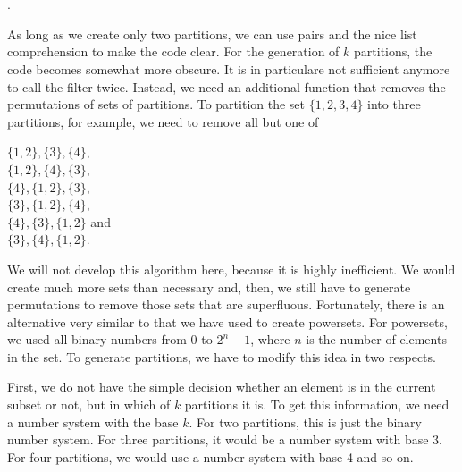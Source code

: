 \documentclass{scrreprt}
\newcommand{\texfamily}{\fontfamily{cmtex}\selectfont}
\newcommand{\Sp}{\hskip.33334em\relax}
\begin{document}
\text{\texfamily ([1,3],[2])}\\
\text{\texfamily ([2,3],[1])}\\
\text{\texfamily ([3],\Sp [1,2])}.

As long as we create only two partitions,
we can use pairs and the 
nice list comprehension to make the code clear.
For the generation of $k$ partitions,
the code becomes somewhat more obscure.
It is in particulare not sufficient anymore
to call the filter twice.
Instead, we need an additional function
that removes the permutations of sets of partitions.
To partition the set $\lbrace 1,2,3,4\rbrace$
into three partitions, for example,
we need to remove all but one of

$\lbrace 1,2\rbrace, \lbrace 3\rbrace, \lbrace 4\rbrace$,\\ 
$\lbrace 1,2\rbrace, \lbrace 4\rbrace, \lbrace 3\rbrace$,\\
$\lbrace 4\rbrace, \lbrace 1,2\rbrace, \lbrace 3\rbrace$,\\
$\lbrace 3\rbrace, \lbrace 1,2\rbrace, \lbrace 4\rbrace$,\\
$\lbrace 4\rbrace, \lbrace 3\rbrace, \lbrace 1,2\rbrace$ and\\
$\lbrace 3\rbrace, \lbrace 4\rbrace, \lbrace 1,2\rbrace$.

We will not develop this algorithm here,
because it is highly inefficient.
We would create much more sets than necessary
and, then, we still have to generate permutations
to remove those sets that are superfluous.
Fortunately, there is an alternative
very similar to that we have used to create powersets.
For powersets, we used all binary numbers from 0 to $2^n-1$,
where $n$ is the number of elements in the set.
To generate partitions, we have to modify this idea
in two respects.

First, we do not have the simple decision
whether an element is in the current subset or not,
but in which of $k$ partitions it is.
To get this information, we need a number system
with the base $k$.
For two partitions, this is just the binary number system.
For three partitions, it would be a number system with base 3.
For four partitions, we would use a number system with base 4 
and so on.
\end{document}
